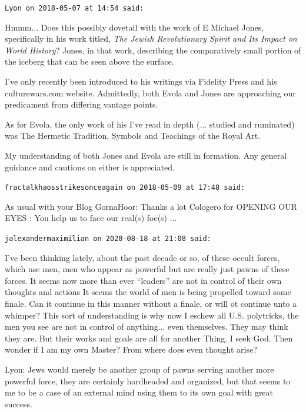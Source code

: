 \begin{footnotesize}
\begin{sffamily}
\texttt{Lyon on 2018-05-07 at 14:54 said:}

Hmmm... Does this possibly dovetail with the work of E Michael Jones, specifically in his work titled, \textit{The Jewish Revolutionary Spirit and Its Impact on World History}? Jones, in that work, describing the comparatively small portion of the iceberg that can be seen above the surface.

I've only recently been introduced to his writings via Fidelity Press and his culturewars.com website. Admittedly, both Evola and Jones are approaching our predicament from differing vantage points.

As for Evola, the only work of his I've read in depth (... studied and ruminated) was The Hermetic Tradition, Symbols and Teachings of the Royal Art.

My understanding of both Jones and Evola are still in formation. Any general guidance and cautions on either is appreciated.

\hfill

\texttt{fractalkhaosstrikesonceagain on 2018-05-09 at 17:48 said:}

As usual with your Blog GornaHoor: Thanks a lot Cologero for OPENING OUR EYES : You help us to face our real(s) foe(s) ... 

\hfill

\texttt{jalexandermaximilian on 2020-08-18 at 21:08 said:}

I've been thinking lately, about the past decade or so, of these occult forces, which use men, men who appear as powerful but are really just pawns of these forces. It seems now more than ever ``leaders'' are not in control of their own thoughts and actions It seems the world of men is being propelled toward some finale. Can it continue in this manner without a finale, or will ot continue unto a whimper? This sort of understanding is why now I eschew all U.S. polytricks, the men you see are not in control of anything... even themselves. They may think they are. But their works and goals are all for another Thing. I seek God. Then wonder if I am my own Master? From where does even thought arise?

Lyon: Jews would merely be another group of pawns serving another more powerful force, they are certainly hardheaded and organized, but that seems to me to be a case of an external mind using them to its own goal with great success.


\end{sffamily}
\end{footnotesize}
